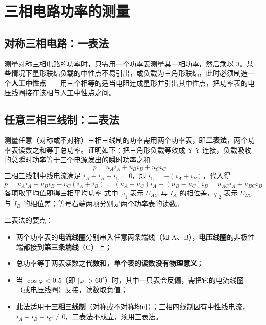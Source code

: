 
\section{三相电路功率的测量}
\subsection{对称三相电路：一表法}
测量对称三相电路的功率时，只需用一个功率表测量其一相功率，然后乘以 3。某些情况下星形联结负载的中性点不易引出，或负载为三角形联结，此时必须制造一个\textbf{人工中性点}——用三个相等的适当电阻连成星形并引出其中性点，把功率表的电压线圈接在该相与人工中性点之间。

\subsection{任意三相三线制：二表法}
测量任意（对称或不对称）三相三线制的功率需用两个功率表，即\textbf{二表法}，两个功率表读数之和等于总功率。证明如下：把三角形负载等效成 Y-Y 连接，负载吸收的总瞬时功率等于三个电源发出的瞬时功率之和
\begin{equation}
p=u_Ai_A+u_Bi_B+u_Ci_C
\end{equation}
三相三线制中线电流满足 $i_A+i_B+i_C=0$，即 $i_C=-\left(i_A+i_B\right)$，代入得
\begin{equation}
p=u_Ai_A+u_Bi_B-u_C\left(i_A+i_B\right)
=\left(u_A-u_C\right)i_A+\left(u_B-u_C\right)i_B
=u_{AC}i_A+u_{BC}i_B
\end{equation}
各项取平均值即得三相平均功率
式中 $\varphi_1$ 表示 $\dot{U}_{AC}$ 与 $\dot{I}_A$ 的相位差，$\varphi_2$ 表示 $\dot{U}_{BC}$ 与 $\dot{I}_B$ 的相位差；等号右端两项分别是两个功率表的读数。

二表法的要点：
\begin{itemize}
  \item 两个功率表的\textbf{电流线圈}分别串入任意两条端线（如 A、B），\textbf{电压线圈}的非极性端都接到\textbf{第三条端线}（C）上；
  \item 总功率等于两表读数之\textbf{代数和}，\textbf{单个表的读数没有物理意义}；
  \item 当 $\cos\varphi<0.5$（即 $|\varphi|>60^\circ$）时，其中一只表会反偏，需把它的电流线圈（或电压线圈）反接，读数取负值；
  \item 此法适用于\textbf{三相三线制}（对称或不对称均可）；三相四线制因有中性线电流，$i_A+i_B+i_C\neq0$，二表法不成立，须用三表法。
\end{itemize}

